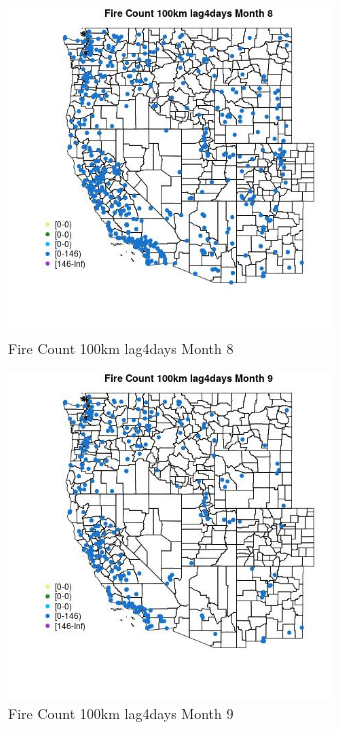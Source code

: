 \begin{figure} 
\centering  
\includegraphics[width=0.77\textwidth]{Code_Outputs/Report_ML_input_PM25_Step4_part_e_de_duplicated_aves_compiled_2019-05-18wNAs_MapObsMo8Fire_Count_100km_lag4days.jpg} 
\caption{\label{fig:Report_ML_input_PM25_Step4_part_e_de_duplicated_aves_compiled_2019-05-18wNAsMapObsMo8Fire_Count_100km_lag4days}Fire Count 100km lag4days Month 8} 
\end{figure} 
 

\clearpage 

\begin{figure} 
\centering  
\includegraphics[width=0.77\textwidth]{Code_Outputs/Report_ML_input_PM25_Step4_part_e_de_duplicated_aves_compiled_2019-05-18wNAs_MapObsMo9Fire_Count_100km_lag4days.jpg} 
\caption{\label{fig:Report_ML_input_PM25_Step4_part_e_de_duplicated_aves_compiled_2019-05-18wNAsMapObsMo9Fire_Count_100km_lag4days}Fire Count 100km lag4days Month 9} 
\end{figure} 
 


